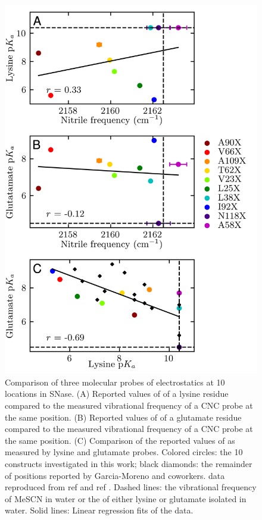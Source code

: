 \begin{figure}
    \center
    \includegraphics[width=\single]{figures-snase/pKa_vs_peak.png}
    \caption[Comparison of three molecular probes of electrostatics at 10 locations in SNase]{
        Comparison of three molecular probes of electrostatics at 10 locations in SNase. 
        (A) Reported values of \pKa{} of a lysine residue compared to the measured vibrational frequency of a CNC probe at the same position. 
        (B) Reported values of \pKa{} of a glutamate residue compared to the measured vibrational frequency of a CNC probe at the same position. 
        (C) Comparison of the reported values of \pKa{} as measured by lysine and glutamate \pKa{} probes. 
        Colored circles: the 10 constructs investigated in this work; 
        black diamonds: the remainder of positions reported by Garcia-Moreno and coworkers. 
        \pKa{} data reproduced from ref  and ref . 
        Dashed lines: the vibrational frequency of MeSCN in water or the \pKa{} of either lysine or glutamate isolated in water. 
        Solid lines: Linear regression fits of the data.
    }
    \label{fig:snase-pKas_vs_peak}
\end{figure}

